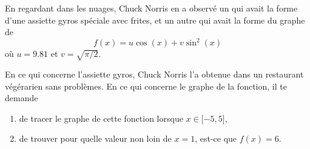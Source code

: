 \begin{exercice}\label{exoLCexoMatlab0007}

En regardant dans les nuages, Chuck Norris en a observé un qui avait la forme d'une assiette gyros spéciale avec frites, et un autre qui avait la forme du graphe de
\begin{equation}
       \nonumber f(x)=u\cos(x)+v\sin^2(x)
\end{equation}
où $u=9.81$ et $v=\sqrt{\pi/2}$.

En ce qui concerne l'assiette gyros, Chuck Norris l'a obtenue dans un restaurant végérarien sans problèmes. En ce qui concerne le graphe de la fonction, il te demande
\begin{enumerate}

       \item
               de tracer le graphe de cette fonction lorsque $x\in\mathopen[ -5 , 5 \mathclose]$,
       \item
               de trouver pour quelle valeur non loin de $x=1$, est-ce que $f(x)=6$.

\end{enumerate}

\end{exercice}

